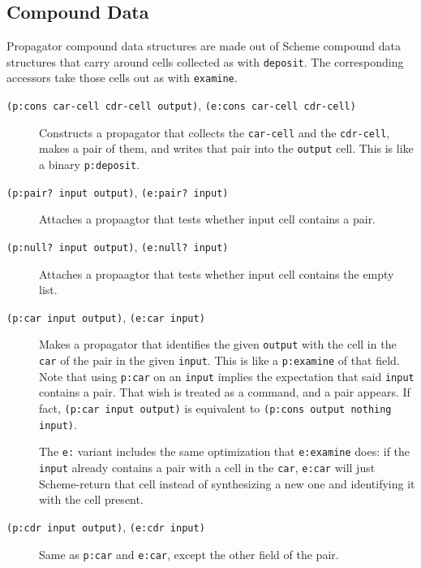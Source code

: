 \documentclass[12pt,letterpaper,english]{article}
\begin{document}

\subsection{Compound Data}
\label{compound-data}

Propagator compound data structures are made out of Scheme compound
data structures that carry around cells collected as with \texttt{deposit}.
The corresponding accessors take those cells out as with \texttt{examine}.
\begin{description}
\item[{\texttt{(p:cons car-cell cdr-cell output)}, \texttt{(e:cons car-cell cdr-cell)}}] \leavevmode 
Constructs a propagator that collects the \texttt{car-cell} and the
\texttt{cdr-cell}, makes a pair of them, and writes that pair into the
\texttt{output} cell.  This is like a binary \texttt{p:deposit}.

\item[{\texttt{(p:pair? input output)}, \texttt{(e:pair? input)}}] \leavevmode 
Attaches a propaagtor that tests whether input cell contains a
pair.

\item[{\texttt{(p:null? input output)}, \texttt{(e:null? input)}}] \leavevmode 
Attaches a propaagtor that tests whether input cell contains
the empty list.

\item[{\texttt{(p:car input output)}, \texttt{(e:car input)}}] \leavevmode 
Makes a propagator that identifies the given \texttt{output} with the
cell in the \texttt{car} of the pair in the given \texttt{input}.  This is
like a \texttt{p:examine} of that field.  Note that using \texttt{p:car} on an
\texttt{input} implies the expectation that said \texttt{input} contains a
pair.  That wish is treated as a command, and a pair appears.
If fact, \texttt{(p:car input output)} is equivalent to
\texttt{(p:cons output nothing input)}.

The \texttt{e:} variant includes the same optimization that \texttt{e:examine}
does: if the \texttt{input} already contains a pair with a cell in the
\texttt{car}, \texttt{e:car} will just Scheme-return that cell instead of
synthesizing a new one and identifying it with the cell present.

\item[{\texttt{(p:cdr input output)}, \texttt{(e:cdr input)}}] \leavevmode 
Same as \texttt{p:car} and \texttt{e:car}, except the other field of the
pair.

\end{description}
\end{document}
